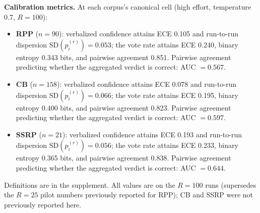 \textbf{Calibration metrics.} At each corpus's canonical cell (high effort, temperature 0.7, $R{=}100$):
\begin{itemize}[leftmargin=*,itemsep=2pt]
\item \textbf{RPP} ($n{=}90$): verbalized confidence attains ECE 0.105 and run-to-run dispersion $\mathrm{SD}(p_i^{(r)}) = 0.053$; the vote rate attains ECE 0.240, binary entropy 0.343 bits, and pairwise agreement 0.851. Pairwise agreement predicting whether the aggregated verdict is correct: AUC $= 0.567$.
\item \textbf{CB} ($n{=}158$): verbalized confidence attains ECE 0.078 and run-to-run dispersion $\mathrm{SD}(p_i^{(r)}) = 0.066$; the vote rate attains ECE 0.195, binary entropy 0.400 bits, and pairwise agreement 0.823. Pairwise agreement predicting whether the aggregated verdict is correct: AUC $= 0.597$.
\item \textbf{SSRP} ($n{=}21$): verbalized confidence attains ECE 0.193 and run-to-run dispersion $\mathrm{SD}(p_i^{(r)}) = 0.056$; the vote rate attains ECE 0.233, binary entropy 0.365 bits, and pairwise agreement 0.838. Pairwise agreement predicting whether the aggregated verdict is correct: AUC $= 0.644$.
\end{itemize}
Definitions are in the supplement. All values are on the $R{=}100$ runs (supersedes the $R{=}25$ pilot numbers previously reported for RPP); CB and SSRP were not previously reported here.
